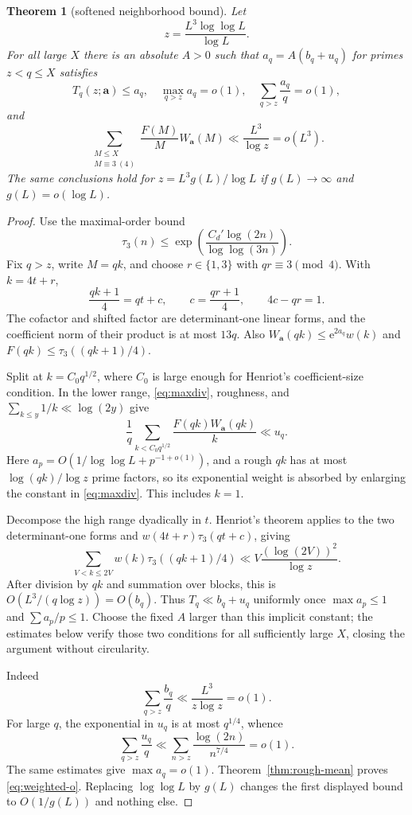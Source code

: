 \documentclass[10pt,reqno]{amsart}
\newtheorem{theorem}{Theorem}[section]
\theoremstyle{definition}
\newcommand{\e}{\mathrm e}
\newcommand{\1}{\mathbf 1}
\begin{document}
\begin{theorem}[softened neighborhood bound]\label{thm:soft-neighbor}
Let
\begin{equation}\label{eq:zchoice}
 z=\frac{L^3\log\log L}{\log L}.
\end{equation}
For all large $X$ there is an absolute $A>0$ such that
$a_q=A(b_q+u_q)$ for primes $z<q\leq X$ satisfies
\[
 T_q(z;\boldsymbol a)\leq a_q,
 \quad \max_{q>z}a_q=o(1),
 \quad\sum_{q>z}\frac{a_q}q=o(1),
\]
and
\begin{equation}\label{eq:weighted-o}
 \sum_{\substack{M\leq X\\M\equiv3\ (4)}}
 \frac{F(M)}M W_{\boldsymbol a}(M)
 \ll\frac{L^3}{\log z}=o(L^3).
\end{equation}
The same conclusions hold for $z=L^3g(L)/\log L$ if
$g(L)\to\infty$ and $g(L)=o(\log L)$.
\end{theorem}
\begin{proof}
Use the maximal-order bound
\begin{equation}\label{eq:maxdiv}
 \tau_3(n)\leq\exp\!\left(\frac{C_d'\log(2n)}{\log\log(3n)}\right).
\end{equation}
Fix $q>z$, write $M=qk$, and choose $r\in\{1,3\}$ with $qr\equiv3\pmod4$.  With $k=4t+r$,
\[
 \frac{qk+1}{4}=qt+c,\qquad c=\frac{qr+1}{4},\qquad4c-qr=1.
\]
The cofactor and shifted factor are determinant-one linear forms, and the coefficient norm of their product is at most $13q$.  Also
$W_{\boldsymbol a}(qk)\leq\e^{2a_q}w(k)$ and
$F(qk)\leq\tau_3((qk+1)/4)$.

Split at $k=C_0q^{1/2}$, where $C_0$ is large enough for Henriot's coefficient-size condition.  In the lower range, \eqref{eq:maxdiv}, roughness, and $\sum_{k\leq y}1/k\ll\log(2y)$ give
\[
 \frac1q\sum_{k<C_0q^{1/2}}
 \frac{F(qk)W_{\boldsymbol a}(qk)}k\ll u_q.
\]
Here $a_p=O(1/\log\log L+p^{-1+o(1)})$, and a rough $qk$ has at most $\log(qk)/\log z$ prime factors, so its exponential weight is absorbed by enlarging the constant in \eqref{eq:maxdiv}.  This includes $k=1$.

Decompose the high range dyadically in $t$.  Henriot's theorem applies to the two determinant-one forms and $w(4t+r)\tau_3(qt+c)$, giving
\[
 \sum_{V<k\leq2V}w(k)\tau_3((qk+1)/4)
 \ll V\frac{(\log(2V))^2}{\log z}.
\]
After division by $qk$ and summation over blocks, this is
$O(L^3/(q\log z))=O(b_q)$.  Thus $T_q\ll b_q+u_q$ uniformly once
$\max a_p\leq1$ and $\sum a_p/p\leq1$.  Choose the fixed $A$ larger than this implicit constant; the estimates below verify those two conditions for all sufficiently large $X$, closing the argument without circularity.

Indeed
\[
 \sum_{q>z}\frac{b_q}q\ll\frac{L^3}{z\log z}=o(1).
\]
For large $q$, the exponential in $u_q$ is at most $q^{1/4}$, whence
\[
 \sum_{q>z}\frac{u_q}{q}\ll
 \sum_{n>z}\frac{\log(2n)}{n^{7/4}}=o(1).
\]
The same estimates give $\max a_q=o(1)$.  Theorem~\ref{thm:rough-mean} proves \eqref{eq:weighted-o}.  Replacing $\log\log L$ by $g(L)$ changes the first displayed bound to $O(1/g(L))$ and nothing else.
\end{proof}
\end{document}
